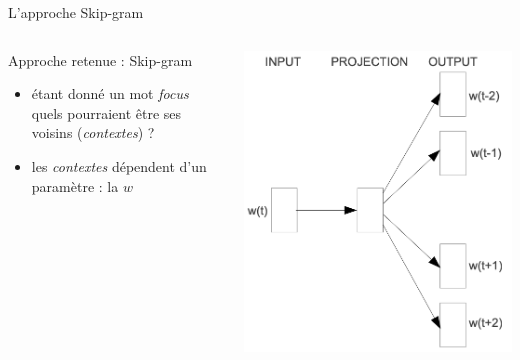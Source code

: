 \documentclass[10pt,xcolor=table,color={dvipsnames,usenames},ignorenonframetext,usepdftitle=false,french]{beamer}
\begin{document}
\begin{frame}{L’approche Skip-gram}
\protect\hypertarget{lapproche-skip-gram-1}{}

\begin{columns}
\begin{column}{0.6\textwidth}
Approche retenue : Skip-gram
\begin{itemize}
\item étant donné un mot \emph{focus} quels pourraient être ses voisins (\emph{contextes}) ?
\item les \emph{contextes} dépendent d'un paramètre : la  $w$
\end{itemize}
\medskip

\medskip {}
\end{column}
\begin{column}{0.4\textwidth} 
\includegraphics[width=\textwidth]{img/skip_gram.png}

\end{column}
\end{columns}


\end{frame}
\end{document}
